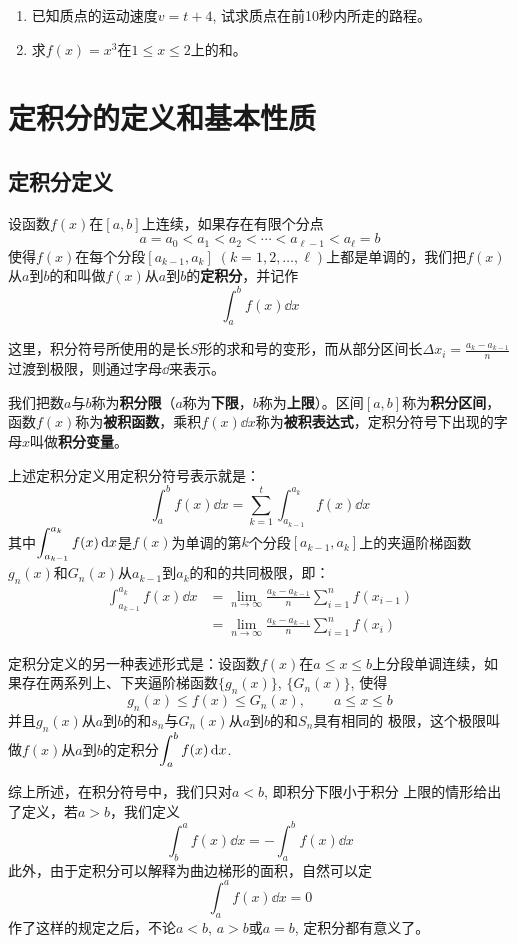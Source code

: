 \begin{ex}
\begin{enumerate}
    \item 已知质点的运动速度$v=t+4$, 试求质点在前10秒内所走的路程。
    \item 求$f(x)=x^3$在$1\le x\le 2$上的和。
\end{enumerate}
\end{ex}


\section{定积分的定义和基本性质}
\subsection{定积分定义}

设函数$f(x)$在$[a,b]$上连续，如果存在有限个分点
\[a=a_0<a_1<a_2<\cdots<a_{\ell-1}<a_{\ell}=b\]
使得$f(x)$在每个分段$[a_{k-1},a_k]\; (k=1, 2,\ldots,\ell)$上都是单调的，我们把$f(x)$从$a$到$b$的和叫做$f(x)$从$a$到$b$的\textbf{定积分}，并记作
\[\int^b_a f(x) \dd x\]

这里，积分符号所使用的是长$S$形的求和号的变形，而从部分区间长$\Delta x_i=\frac{a_k-a_{k-1}}{n}$过渡到极限，则通过字母$\dd$来表示。

我们把数$a$与$b$称为\textbf{积分限}（$a$称为\textbf{下限}，$b$称为\textbf{上限}）。区间$[a,b]$称为\textbf{积分区间}，函数$f(x)$称为\textbf{被积函数}，乘积$f(x)\dd x$称为\textbf{被积表达式}，定积分符号下出现的字母$x$叫做\textbf{积分变量}。

上述定积分定义用定积分符号表示就是：
\[\int^b_a f(x) \dd x=\sum^t_{k=1}\int^{a_k}_{a_{k-1}}f(x)\dd x\]
其中$\displaystyle\int^{a_k}_{a_{k-1}}f(x)\,{\rm d} x$是$f(x)$为单调的第$k$个分段$[a_{k-1},a_k]$上的夹逼阶梯函数$g_n(x)$和$G_n(x)$从$a_{k-1}$到$a_k$的和的共同极限，即：
\[\begin{split}
    \int^{a_k}_{a_{k-1}}f(x)\dd x&=\lim_{n\to \infty}\frac{a_k-a_{k-1}}{n}\sum^n_{i=1}f(x_{i-1})\\
    &=\lim_{n\to \infty}\frac{a_k-a_{k-1}}{n}\sum^n_{i=1}f(x_{i})
\end{split}\]

定积分定义的另一种表述形式是：设函数$f(x)$在$a\le x\le b$上分段单调连续，如果存在两系列上、下夹逼阶梯函数$\{g_n(x)\}$, $\{G_n(x)\}$, 使得
\[g_n (x)\le f(x)\le G_n(x),\qquad a\le x\le b\]
并且$g_n(x)$从$a$到$b$的和$s_n$与$G_n(x)$从$a$到$b$的和$S_n$具有相同的
极限，这个极限叫做$f(x)$从$a$到$b$的定积分$\displaystyle\int^b_a f(x) \,{\rm d} x$.

综上所述，在积分符号中，我们只对$a<b$, 即积分下限小于积分
上限的情形给出了定义，若$a>b$，我们定义
\[\int^a_b f(x) \dd x=-\int^b_a f(x) \dd x\]
此外，由于定积分可以解释为曲边梯形的面积，自然可以定
\[\int^a_a f(x) \dd x=0\]
作了这样的规定之后，不论$a<b$, $a>b$或$a=b$, 定积分都有意义了。


